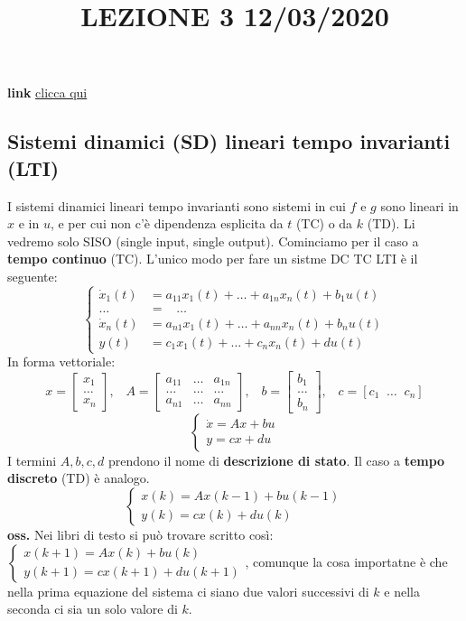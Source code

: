 \title{LEZIONE 3 12/03/2020}\newline
\textbf{link} \href{https://web.microsoftstream.com/video/0f5f35c0-ba36-4f9c-a496-057ebab138ec?list=user&userId=faa91214-a6f5-40d7-8875-253fd49b8ce1}{clicca qui}
\subsection{Sistemi dinamici (SD) lineari tempo invarianti (LTI)}
I sistemi dinamici lineari tempo invarianti sono sistemi in cui $f$ e $g$ sono lineari in $x$ e in $u$, e per cui non c'è dipendenza esplicita da $t$ (TC) o da $k$ (TD).\newline
Li vedremo solo SISO (single input, single output).\newline
\newline
Cominciamo per il caso a \textbf{tempo continuo} (TC). L'unico modo per fare un sistme DC TC LTI è il seguente:
\[
    \begin{cases}
        \dot{x}_1(t) &= a_{11}x_1(t) + \dots+ a_{1n}x_{n}(t) + b_1 u(t)\\
        \dots &= \;\;\; \dots\\
        \dot{x}_n(t) &= a_{n1}x_1(t) +\dots+ a_{nn}x_n(t) + b_nu(t)\\
        y(t) &= c_1x_1(t) + \dots + c_n x_n(t) + d u(t)
    \end{cases}
\]
In forma vettoriale:
\[
    x = \left[\begin{matrix}
        x_1\\
        \dots\\
        x_n
    \end{matrix}\right], \;\;\; A = \left[\begin{matrix}
        a_{11} & \dots & a_{1n}\\
        \dots & \dots & \dots\\
        a_{n1} & \dots & a_{nn}
    \end{matrix}\right], \;\;\; b = \left[\begin{matrix}
        b_1\\
        \dots\\
        b_n
    \end{matrix}\right], \;\;\; c = [c_1 \;\; \dots \;\; c_n]
\]
\[
    \begin{cases}
        \dot{x} = Ax+bu\\
        y = cx +du
    \end{cases}
\]
I termini $A, b, c, d$ prendono il nome di \textbf{descrizione di stato}.\newline
\newline
Il caso a \textbf{tempo discreto} (TD) è analogo.
\[
    \begin{cases}
        x(k) = Ax(k-1) + bu(k-1)\\
        y(k) = cx(k) +d u(k)
    \end{cases}
\] 
\textbf{oss.} Nei libri di testo si può trovare scritto così: $\begin{cases}
    x(k+1) = Ax(k) + bu(k)\\
    y(k+1) = cx(k+1) +d u(k+1)
\end{cases}$, comunque la cosa importatne è che nella prima equazione del sistema ci siano due valori successivi di $k$ e nella seconda ci sia un solo valore di $k$.
